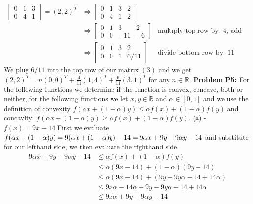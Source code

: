 \documentclass{article}
\begin{document}
\begin{align}
    \begin{bmatrix}
        0 & 1 & 3 \\
        0 & 4 & 1
    \end{bmatrix}
    = (2,2)^T & \Rightarrow 
    \begin{bmatrix}
        0 & 1 & 3 & 2 \\
        0 & 4 & 1 & 2   
    \end{bmatrix} \\ 
    & \Rightarrow
    \begin{bmatrix}
        0 & 1 & 3 & 2 \\
        0 & 0 & -11 & -6 
    \end{bmatrix} & \text{multiply top row by -4, add to bottom row } \\ & \Rightarrow
    \begin{bmatrix}
        0 & 1 & 3 & 2 \\
        0 & 0 & 1 & 6/11
    \end{bmatrix} & \text{divide bottom row by -11}
\end{align}
We plug $6/11$ into the top row of our matrix $(3)$ and we get $(2,2)^T = n(0, 0)^T + \frac{4}{11}(1,4)^T + \frac{6}{11}(3,1)^T$
for any $n \in \mathbb{R}$.
\newline
\break
\textbf{Problem P5:} For the following functions we determine if the function is convex, concave, both or neither, for the following functions we let $x,y \in \mathbb{R}$ and $\alpha \in [0,1]$ and we use the definition of convexity $f(\alpha x + (1 - \alpha)y) \leq \alpha f(x) + (1 - \alpha)f(y)$ and concavity: $f(\alpha x + (1 - \alpha)y) \geq \alpha f(x) + (1 - \alpha)f(y)$.
\newline
\break
(a) - \underline{$f(x) = 9x - 14$} \qquad First we evaluate $f(\alpha x + (1 - \alpha)y) = 9(\alpha x + (1 - \alpha)y) - 14  \\ = 9 \alpha x + 9y - 9 \alpha y - 14$ and substitute for our lefthand side, we then evaluate the righthand side. 
\begin{align*}
    9 \alpha x + 9y - 9 \alpha y - 14 & \leq \alpha f(x) + (1 - \alpha)f(y) \\
    & \leq \alpha (9x-14) + (1 - \alpha)(9y-14) \\
    & \leq \alpha (9x-14) + (9y - 9y \alpha - 14 + 14 \alpha) \\
    & \leq 9x \alpha - 14 \alpha + 9y - 9y \alpha - 14 + 14 \alpha \\
    & \leq 9x \alpha + 9y - 9 \alpha y - 14
\end{align*}
\end{document}
